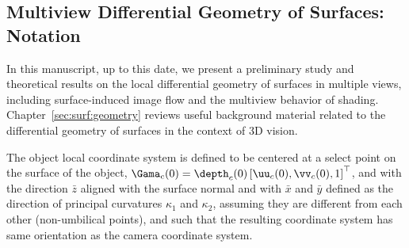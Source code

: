 \subsection{Multiview Differential Geometry of Surfaces: Notation}\label{sec:dg:surf:notation}

In this manuscript, up to this date, we present a preliminary study and theoretical results on
the local differential geometry of surfaces in multiple views, including
surface-induced image flow and the multiview behavior of shading.
Chapter~\ref{sec:surf:geometry} reviews useful background material related to
the differential geometry of surfaces in the context of 3D vision.

The object local coordinate system is defined to be centered at a select point on the
surface of the object, $\Gama_c(0) =
\depth_{c}(0)\left[\uu_c(0),\vv_c(0),1\right]^\top$, and with the direction
$\bar z$ aligned with the surface normal and with $\bar x$ and $\bar y$ defined
as the direction of principal curvatures $\kappa_1$ and $\kappa_2$,%
%
%
assuming they are different from each
other (non-umbilical points), and such that the resulting coordinate system has
same orientation as the camera coordinate system. 

